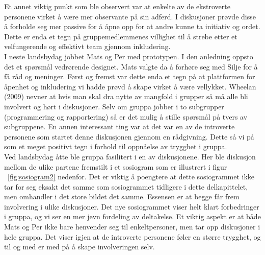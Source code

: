 Et annet viktig punkt som ble observert var at enkelte av de ekstroverte personene virket å være mer observante på sin adferd. I diskusjoner prøvde disse å forholde seg mer passive for å åpne opp for at andre kunne ta initiativ og ordet. Dette er enda et tegn på gruppemedlemmenes villighet til å strebe etter et velfungerende og effektivt team gjennom inkludering.\\

I neste landsbydag jobbet Mats og Per med prototypen. I den anledning oppsto det et spørsmål vedrørende designet. Mats valgte da å forhøre seg med Silje for å få råd og meninger. Først og fremst var dette enda et tegn på at plattformen for åpenhet og inkludering vi hadde prøvd å skape virket å være vellykket. Wheelan (2009)\citep{effectiveTeams} nevner at hvis man skal dra nytte av mangfold i grupper så må alle bli involvert og hørt i diskusjoner. Selv om gruppa jobber i to subgrupper (programmering og rapportering) så er det mulig å stille spørsmål på tvers av subgruppene. En annen interessant ting var at det var en av de introverte personene som startet denne diskusjonen gjennom en rådgivning. Dette så vi på som et meget positivt tegn i forhold til oppnåelse av trygghet i gruppa.\\

Ved landsbydag åtte ble gruppa fasilitert i en av diskusjonene. Her ble diskusjon mellom de ulike partene fremstilt i et sosiogram som er illustrert i figur ~\ref{fig:sosiogram2} nedenfor. Det er viktig å poengtere at dette sosiogrammet ikke tar for seg eksakt det samme som sosiogrammet tidligere i dette delkapittelet, men omhandler i det store bildet det samme. Essensen er at begge får frem involvering i ulike diskusjoner. Det nye sosiogrammet viser helt klart forbedringer i gruppa, og vi ser en mer jevn fordeling av deltakelse. Et viktig aspekt er at både Mats og Per ikke bare henvender seg  til enkeltpersoner, men tar opp diskusjoner i hele gruppa. Det viser igjen at de introverte personene føler en større trygghet, og til og med er med på å skape involveringen selv.\\

